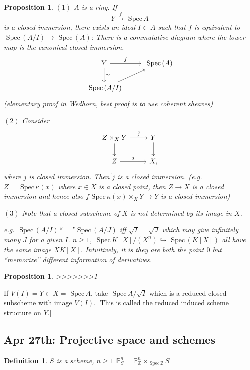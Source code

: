 \documentclass[11pt]{article}
\newtheorem{prop}[thm]{Proposition}
\newtheorem{dfn}[thm]{Definition}
\newcommand{\spec}{\text{ Spec}\,}
\newcommand{\proj}{\mathbb P}
\newcommand{\intg}{\mathbb Z}
\newcommand{\lrta}{\longrightarrow}
\newcommand{\inj}{\hookrightarrow}
\begin{document}
\begin{prop}
$(1)$
$A$ is a ring. If 
$$
Y\overset{f}{\lrta} \spec A
$$ 
is a closed immersion, there exists an ideal $I\subset A$ such that $f$ is equivalent to $\spec(A/I)\lrta \spec (A)$: There is a commutative diagram where the lower map is the canonical closed immersion.
$$
\begin{tikzcd}
Y \arrow[r, "f"] \arrow[d, "\sim"] & \spec(A) \\
\spec(A/I) \arrow[ru] & 
\end{tikzcd}
$$
(elementary proof in Wedhorn, best proof is to use coherent sheaves)

$(2)$ Consider
$$
\begin{tikzcd}
Z\times_X Y \arrow[r, "\tilde{j}"] \arrow[d] & Y \arrow[d] \\
Z \arrow[r, "j"] & X,
\end{tikzcd}
$$ 
where $j$ is closed immersion. Then $\tilde{j}$ is a closed immersion. (e.g. $Z=\spec \kappa(x)$ where $x\in X$ is a closed point, then $Z\lrta X$ is a closed immersion and hence also $f\spec \kappa(x)\times_X Y\lrta Y$ is a closed immersion)

$(3)$ Note that a closed subscheme of $X$ is not determined by its image in $X$.

e.g. $\spec(A/I)$``$=$''$\spec (A/J)$ iff $\sqrt{I}=\sqrt{J}$ which may give  infinitely many $J$ for  a given $I$.
$n\geq 1$, $\spec K[X]/(X^n)\inj \spec(K[X])$ all have the same image $XK[X]$. Intuitively, it is they are both the point $0$ but ``memorize'' different information of derivatives.
\end{prop}

\begin{prop}
>>>>>>>1
\end{prop}
If $V(I)=Y\subset X=\spec A$, take $\spec A/\sqrt{I}$ which is a reduced closed subscheme with image $V(I)$. [This is called the reduced induced scheme structure on $Y$.]

\subsection{Apr 27th: Projective space and schemes}
\begin{dfn}
$S$ is a scheme, $n\geq 1$ $\proj^n_S=\proj^n_\intg\times_{\spec \intg} S$
\end{dfn}
\end{document}
